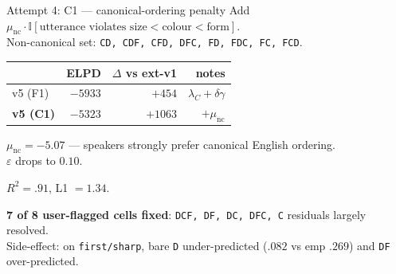 \documentclass[10pt,aspectratio=169]{beamer}
\newcommand{\hl}[1]{{\color{hlblue}\textbf{#1}}}
\newcommand{\bad}[1]{{\color{hlred}#1}}
\begin{document}
\begin{frame}{Attempt 4: C1 --- canonical-ordering penalty}
Add $\mu_\mathrm{nc} \cdot \mathbb{I}[\text{utterance violates size} < \text{colour} < \text{form}]$.\\
Non-canonical set: \texttt{CD, CDF, CFD, DFC, FD, FDC, FC, FCD}.

\vspace{0.5em}
\begin{center}
\begin{tabular}{lrrr}
\toprule
& ELPD & $\Delta$ vs ext-v1 & notes\\
\midrule
v5 (F1) & $-5933$ & $+454$ & $\lambda_C + \delta\gamma$ \\
\hl{v5 (C1)} & \hl{$-5323$} & \hl{$+1063$} & \hl{$+ \mu_\mathrm{nc}$} \\
\bottomrule
\end{tabular}
\end{center}

\vspace{0.5em}
\hl{$\mu_\mathrm{nc} = -5.07$} --- speakers strongly prefer canonical English ordering.
\\[0.2em]
$\varepsilon$ drops to $0.10$.

\vspace{0.5em}
$R^2 = .91$, L1 $= 1.34$.

\vspace{0.3em}
\hl{7 of 8 user-flagged cells fixed}:
\texttt{DCF, DF, DC, DFC, C} residuals largely resolved. \\
\bad{Side-effect:} on \texttt{first/sharp}, bare \texttt{D} under-predicted ($.082$ vs emp $.269$) and \texttt{DF} over-predicted.
\end{frame}
\end{document}
